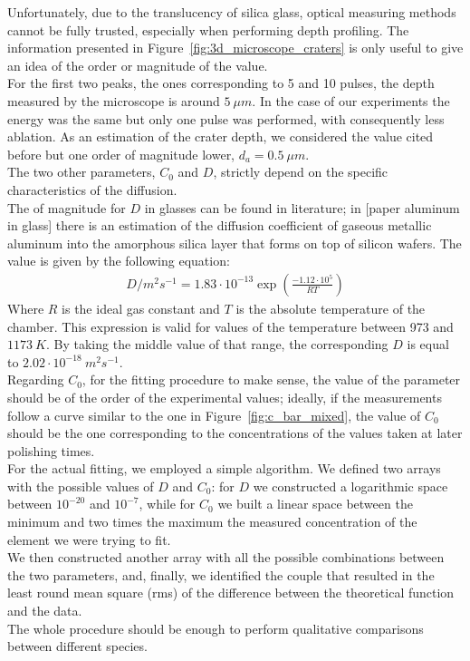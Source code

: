  Unfortunately, due to the translucency of silica glass, optical measuring methods cannot be fully trusted, especially when performing depth profiling. The information presented in Figure~\ref{fig:3d_microscope_craters} is only useful to give an idea of the order or magnitude of the value.
 \\
For the first two peaks, the ones corresponding to 5 and 10 pulses, the depth measured by the microscope is around $5 \: \mu m$. In the case of our experiments the energy was the same but only one pulse was performed, with consequently less ablation. As an estimation of the crater depth, we considered the value cited before but one order of magnitude lower, $d_a = 0.5 \: \mu m$.
\\
The two other parameters, $C_0$ and $D$, strictly depend on the specific characteristics of the diffusion.
\\
The of magnitude for $D$ in glasses can be found in literature; in [paper aluminum in glass] there is an estimation of the diffusion coefficient of gaseous metallic aluminum into the amorphous silica layer that forms on top of silicon wafers. The value is given by the following equation:
\begin{align}
    D/m^2s^{-1} = 1.83 \cdot 10^{-13}\exp \left(\frac{-1.12 \cdot 10^5}{RT}\right) \label{eq:diffiusion_coef_aluminum}
\end{align}
Where $R$ is the ideal gas constant and $T$ is the absolute temperature of the chamber. This expression is valid for values of the temperature between 973 and $1173 \:K$. By taking the middle value of that range, the corresponding $D$ is equal to $2.02 \cdot 10^{-18} \:m^2s^{-1}$.
\\
Regarding $C_0$, for the fitting procedure to make sense, the value of the parameter should be of the order of the experimental values; ideally, if the measurements follow a curve similar to the one in Figure~\ref{fig:c_bar_mixed}, the value of $C_0$ should be the one corresponding to the concentrations of the values taken at later polishing times.
\\
For the actual fitting, we employed a simple algorithm. We defined two arrays with the possible values of $D$ and $C_0$: for $D$ we constructed a logarithmic space between $10^{-20}$ and $10^{-7}$, while for $C_0$ we built a linear space between the minimum and two times the maximum the measured concentration of the element we were trying to fit.
\\
We then constructed another array with all the possible combinations between the two parameters, and, finally, we identified the couple that resulted in the least round mean square (rms) of the difference between the theoretical function and the data.
\\
The whole procedure should be enough to perform qualitative comparisons between different species.





